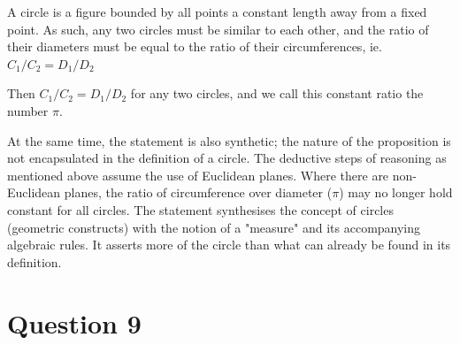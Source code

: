 \documentclass{article}
\begin{document}
A circle is a figure bounded by all points a constant length away from a fixed
point. As such, any two circles must be similar to each other, and the ratio of
their diameters must be equal to the ratio of their circumferences, ie.
$C_{1}/C_{2} = D_{1}/D_{2}$

Then $C_{1}/C_{2} = D_{1}/D_{2}$ for any two circles, and we call this constant ratio the
number $\pi$.

At the same time, the statement is also synthetic; the nature of the proposition
is not encapsulated in the definition of a circle. The deductive steps of
reasoning as mentioned above assume the use of Euclidean planes. Where there are
non-Euclidean planes, the ratio of circumference over diameter ($\pi$) may no
longer hold constant for all circles. The statement synthesises the concept of
circles (geometric constructs) with the notion of a "measure" and its
accompanying algebraic rules. It asserts more of the circle than what can
already be found in its definition.

\section*{Question 9}
\end{document}
